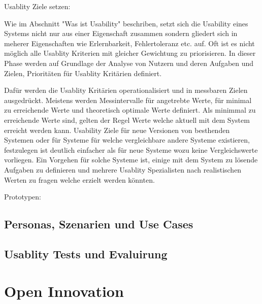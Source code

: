 Usablity Ziele setzen: 

Wie im Abschnitt "Was ist Usability" beschriben, setzt sich die Usability eines Systems nicht nur aus einer Eigenschaft zusammen sondern gliedert sich in meherer Eigenschaften wie Erlernbarkeit, Fehlertoleranz etc. auf. 
Oft ist es nicht möglich alle Usablity Kriterien mit gleicher Gewichtung zu priorisieren. In dieser Phase werden auf Grundlage der Analyse von Nutzern und deren Aufgaben und Zielen,  Prioritäten für Usablity Kritärien definiert. 

Dafür werden die Usablity Kritärien operationalisiert und in messbaren Zielen ausgedrückt. Meistens werden Messintervalle für angetrebte Werte, für minimal zu erreichende Werte 
und theoretisch optimale Werte definiert. Als minimmal zu erreichende Werte sind, gelten der Regel Werte welche aktuell mit dem System erreicht werden kann. Usability Ziele für neue Versionen von besthenden Systemen 
oder für Systeme für welche vergleichbare andere Systeme existieren, festzulegen ist deutlich einfacher als für neue Systeme wozu keine Vergleichswerte vorliegen. Ein Vorgehen für solche Systeme ist, einige mit dem 
System zu lösende Aufgaben zu definieren und mehrere Usablity Spezialisten nach realistischen Werten zu fragen welche erzielt werden könnten.

Prototypen:




\subsection{Personas, Szenarien und Use Cases}




\subsection{Usablity Tests und Evaluirung}

\section{Open Innovation}




